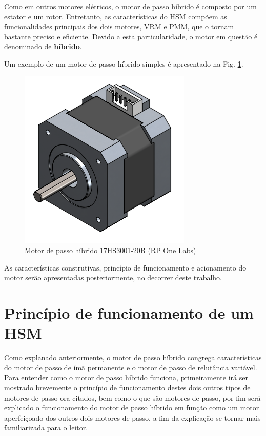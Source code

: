 \documentclass[portugues]{sobraep}
\begin{document}
	Como em outros motores elétricos, o motor de passo híbrido é composto por um estator e um rotor. Entretanto, as características do HSM compõem as funcionalidades principais dos dois motores, VRM e PMM, que o tornam bastante preciso e eficiente. Devido a esta particularidade, o motor em questão é denominado de \textbf{híbrido}.
	
	Um exemplo de um motor de passo híbrido simples é apresentado na Fig. \ref{HSMgrafico}.
	
	\begin{figure}
		\centering
		\includegraphics[scale=.5]{Images/HSMmodel}
		\caption{Motor de passo híbrido 17HS3001-20B (RP One Labs)}
		\label{HSMgrafico}
	\end{figure} 
	
	As características construtivas, princípio de funcionamento e acionamento do motor serão apresentadas posteriormente, no decorrer deste trabalho. 

\section{Princípio de funcionamento de um HSM}
Como explanado anteriormente, o motor de passo híbrido congrega características do motor de passo de ímã permanente e o motor de passo de relutância variável. Para entender como o motor de passo híbrido funciona, primeiramente irá ser mostrado brevemente o princípio de funcionamento destes dois outros tipos de motores de passo ora citados, bem como o que são motores de passo, por fim será explicado o funcionamento do motor de passo híbrido em função como um motor aperfeiçoado dos outros dois motores de passo, a fim da explicação se tornar mais familiarizada para o leitor.  
\end{document}

